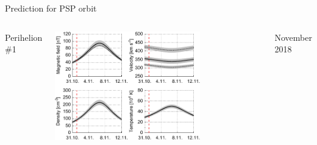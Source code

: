\begin{frame}[plain,c]{Prediction for PSP orbit}{}
	\begin{columns}[c]
	\column{\textwidth}
		
		\centering
		Perihelion \#1\\\ 
		
		\includegraphics[width=0.7\textwidth]{../talk_figures/SPP_perihelia_prediction_f_defense.pdf}
		
		
		November 2018

% 		
	
	\end{columns}
\end{frame}
